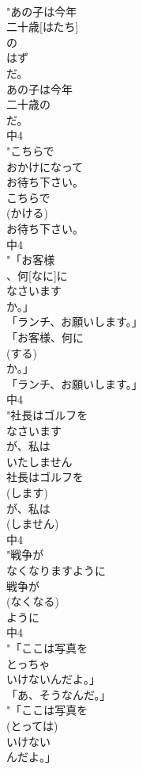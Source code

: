 \documentclass[8pt]{extreport}
\begin{document}
\begin{CJK}{UTF8}{min}
\\	"あの子は今年
\\	二十歳[はたち]
\\	の
\\	はず
\\	だ。
\\	あの子は今年
\\	二十歳の
\\	だ。
\\	中4
\\	"こちらで
\\	おかけになって
\\	お待ち下さい。
\\	こちらで
\\	(かける)
\\	お待ち下さい。
\\	中4
\\	"「お客様
\\	、何[なに]に
\\	なさいます
\\	か。」
\\	「ランチ、お願いします。」
\\	「お客様、何に
\\	(する)
\\	か。」
\\	「ランチ、お願いします。」
\\	中4
\\	"社長はゴルフを
\\	なさいます
\\	が、私は
\\	いたしません
\\	社長はゴルフを
\\	(します)
\\	が、私は
\\	(しません)
\\	中4
\\	"戦争が
\\	なくなりますように
\\	戦争が
\\	(なくなる)
\\	ように
\\	中4
\\	"「ここは写真を
\\	とっちゃ
\\	いけないんだよ。」
\\	「あ、そうなんだ。」
\\	"「ここは写真を
\\	(とっては)
\\	いけない
\\	んだよ。」

\end{CJK}
\end{document}
